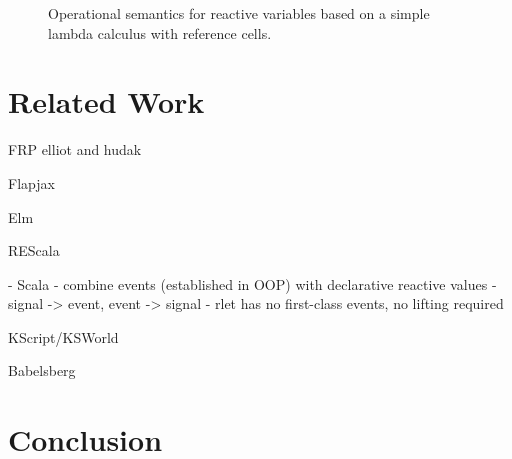 \documentclass{sig-alternate-05-2015}
\begin{document}
\begin{figure*}
  \caption{Operational semantics for reactive variables based on a simple lambda calculus with reference cells.
}
\label{fig:semantics}
\end{figure*}

\section{Related Work}


FRP elliot and hudak

Flapjax~\cite{}

Elm~\cite{czaplicki2013}


REScala~\cite{}

- Scala
- combine events (established in OOP) with declarative reactive values
- signal -> event, event -> signal
- rlet has no first-class events, no lifting required

KScript/KSWorld~\cite{ohshima2013}


Babelsberg~\cite{}

\section{Conclusion}



\end{document}
